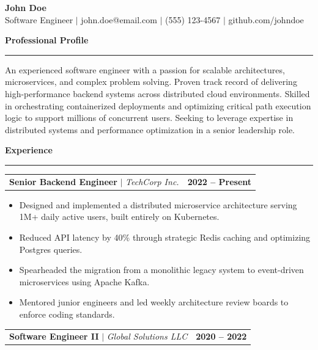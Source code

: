 \documentclass[10pt,a4paper]{article}
\begin{document}
\begin{center}
    {\huge \textbf{John Doe}} \\[2mm]
    Software Engineer $\vert$ john.doe@email.com $\vert$ (555) 123-4567 $\vert$ github.com/johndoe
\end{center}

\vspace{4mm}
\noindent\textbf{\large Professional Profile} \\
\rule{\linewidth}{0.5pt}

An experienced software engineer with a passion for scalable architectures, microservices, and complex problem solving. Proven track record of delivering high-performance backend systems across distributed cloud environments. Skilled in orchestrating containerized deployments and optimizing critical path execution logic to support millions of concurrent users. Seeking to leverage expertise in distributed systems and performance optimization in a senior leadership role.

\vspace{4mm}
\noindent\textbf{\large Experience} \\
\rule{\linewidth}{0.5pt}

\noindent
\begin{tabularx}{\linewidth}{@{}Xr@{}}
\textbf{Senior Backend Engineer} $\vert$ \textit{TechCorp Inc.} & \textbf{2022 -- Present} \\
\end{tabularx}

\begin{itemize}[leftmargin=*,noitemsep]
    \item Designed and implemented a distributed microservice architecture serving 1M+ daily active users, built entirely on Kubernetes.
    \item Reduced API latency by 40\% through strategic Redis caching and optimizing Postgres queries.
    \item Spearheaded the migration from a monolithic legacy system to event-driven microservices using Apache Kafka.
    \item Mentored junior engineers and led weekly architecture review boards to enforce coding standards.
\end{itemize}

\vspace{2mm}
\noindent
\begin{tabularx}{\linewidth}{@{}Xr@{}}
\textbf{Software Engineer II} $\vert$ \textit{Global Solutions LLC} & \textbf{2020 -- 2022} \\
\end{tabularx}
\end{document}
